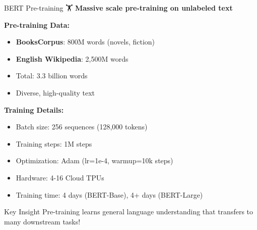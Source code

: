 \documentclass[aspectratio=169]{beamer}
\begin{document}
\begin{frame}[shrink=10]{BERT Pre-training 🏋️}
\small
\textbf{Massive scale pre-training on unlabeled text}

\vspace{1em}

\textbf{Pre-training Data:}
\begin{itemize}\setlength{\itemsep}{0pt}
    \item \textbf{BooksCorpus}: 800M words (novels, fiction)
    \item \textbf{English Wikipedia}: 2,500M words
    \item Total: 3.3 billion words
    \item Diverse, high-quality text
\end{itemize}

\vspace{1em}

\textbf{Training Details:}
\begin{itemize}\setlength{\itemsep}{0pt}
    \item Batch size: 256 sequences (128,000 tokens)
    \item Training steps: 1M steps
    \item Optimization: Adam (lr=1e-4, warmup=10k steps)
    \item Hardware: 4-16 Cloud TPUs
    \item Training time: 4 days (BERT-Base), 4+ days (BERT-Large)
\end{itemize}

\vspace{1em}

\begin{block}{Key Insight}
Pre-training learns general language understanding that transfers to many downstream tasks!
\end{block}
\end{frame}
\end{document}
